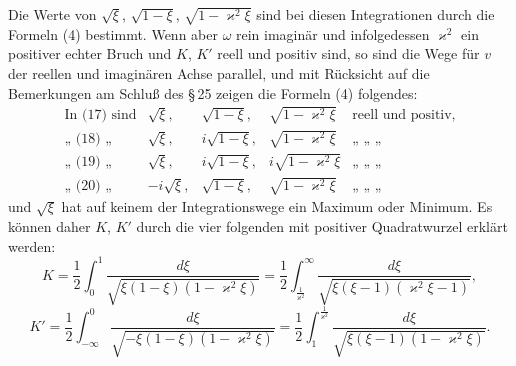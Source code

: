 
Die Werte von $\sqrt{\xi}$, $\sqrt{1-\xi}$, $\sqrt{1-\varkappa^2\xi}$ sind bei diesen Integrationen
 durch die Formeln (4) bestimmt. Wenn aber $\omega$ rein
imaginär und infolgedessen $\varkappa^2$ ein positiver echter Bruch und
$K$, $K'$ reell und positiv sind, so sind die Wege für $v$ der reellen
und imaginären Achse parallel, und mit Rücksicht auf die Bemerkungen
 am Schluß des \S\,25 zeigen die Formeln (4) folgendes:
\[
\begin{array}{lcccl}
\text{In (17) sind} & \sqrt{\xi}, & \sqrt{1-\xi}, & \sqrt{1-\varkappa^2\xi} & \text{reell und positiv,}\\
\text{„ (18) „} & \sqrt{\xi}, & i\sqrt{1-\xi}, & \sqrt{1-\varkappa^2\xi} & \text{„ „ „}\\
\text{„ (19) „} & \sqrt{\xi}, & i\sqrt{1-\xi}, & i\sqrt{1-\varkappa^2\xi} & \text{„ „ „}\\
\text{„ (20) „} & -i\sqrt{\xi}, & \sqrt{1-\xi}, & \sqrt{1-\varkappa^2\xi} & \text{„ „ „}
\end{array}
\]
und $\sqrt{\xi}$ hat auf keinem der Integrationswege ein Maximum oder
Minimum. Es können daher $K$, $K'$ durch die vier folgenden
 mit positiver Quadratwurzel erklärt werden:
\[
K = \frac{1}{2}\int_0^1 \frac{d\xi}{\sqrt{\xi(1-\xi)(1-\varkappa^2\xi)}} = \frac{1}{2}\int_{\frac{1}{\varkappa^2}}^{\infty} \frac{d\xi}{\sqrt{\xi(\xi-1)(\varkappa^2\xi-1)}},
\]
\[
K' = \frac{1}{2}\int_{-\infty}^{0} \frac{d\xi}{\sqrt{-\xi(1-\xi)(1-\varkappa^2\xi)}} = \frac{1}{2}\int_1^{\frac{1}{\varkappa^2}} \frac{d\xi}{\sqrt{\xi(\xi-1)(1-\varkappa^2\xi)}}.
\]
